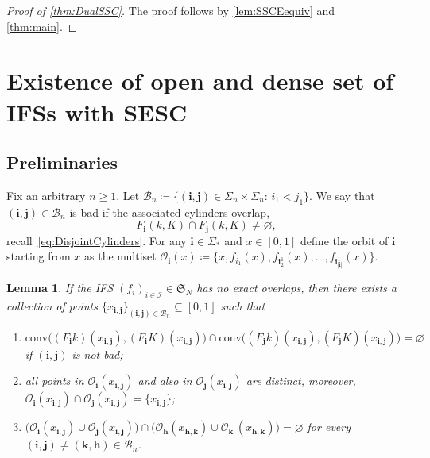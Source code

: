 \documentclass[11pt,a4paper]{article}
\def\cref#1{\ref{#1}}%
\newtheorem{lemma}[theorem]{Lemma}
\theoremstyle{definition}
\theoremstyle{remark}
\newcommand{\0}{\mathbf{0}}
\newcommand{\bi}{\mathbf{i}}
\newcommand{\bj}{\mathbf{j}}
\newcommand{\bk}{{\mathbf{k}}}
\newcommand{\bh}{{\mathbf{h}}}
\numberwithin{equation}{section}
\begin{document}
\begin{proof}[Proof of \cref{thm:DualSSC}]
	The proof follows by \cref{lem:SSCEequiv} and \cref{thm:main}.
\end{proof}

\section{Existence of open and dense set of IFSs with SESC}\label{sec:ProofESCOpenDense}

\subsection{Preliminaries}

Fix an arbitrary $n\geq 1$. Let $\mathcal{B}_n\coloneqq\{(\bi,\bj)\in\Sigma_n\times\Sigma_n:\,
i_1<j_1\}$. We say that $(\bi,\bj)\in\mathcal{B}_n$ is bad if the associated cylinders overlap,
\begin{equation}\label{eq:DefBad}
F_{\bi}(k,K)\cap F_{\bj}(k,K)\neq\varnothing,
\end{equation}
recall~\cref{eq:DisjointCylinders}. For any $\bi\in\Sigma_*$ and $x\in[0,1]$ define the orbit of
$\bi$ starting from $x$ as the multiset $\mathcal{O}_{\bi}(x)\coloneqq \{x,f_{i_1}(x),
f_{\bi_2^1}(x),\ldots,f_{\bi_{|\bi|}^1}(x)\}$. 


\begin{lemma}\label{lem:Pointsx_ij}
If the IFS $(f_i)_{i\in\mathcal{I}}\in\mathfrak{S}_N$ has no exact overlaps, then there exists a collection of points
$\{x_{\bi,\bj}\}_{(\bi,\bj)\in\mathcal{B}_n}\subseteq[0,1]$ such that
\begin{enumerate}[label=(\alph*)]
  \item\label{it:lla} $\mathrm{conv}\big((F_{\bi}k)(x_{\bi,\bj}), (F_{\bi}K)(x_{\bi,\bj})\big) \cap
  \mathrm{conv}\big((F_{\bj}k)(x_{\bi,\bj}),
	(F_{\bj}K)(x_{\bi,\bj})\big)= \varnothing$ if $(\bi,\bj)$ is not bad;  
      \item\label{it:llb} all points in $\mathcal{O}_{\bi}(x_{\bi,\bj})$ and also in $\mathcal{O}_{\bj}(x_{\bi,\bj})$
  are distinct, moreover,
  $\mathcal{O}_{\bi}(x_{\bi,\bj})\cap\mathcal{O}_{\bj}(x_{\bi,\bj})=\{x_{\bi,\bj}\}$;
\item\label{it:llc} $\big(\mathcal{O}_{\bi}(x_{\bi,\bj})\cup \mathcal{O}_{\bj}(x_{\bi,\bj})\big) \cap
  \big(\mathcal{O}_{\bh}(x_{\bh,\bk})\cup
  \mathcal{O}_{\bk}\,(x_{\bh,\bk})\big)=\varnothing$ for every $(\bi,\bj)\neq
  (\bk,\bh)\in\mathcal{B}_n$.
\end{enumerate} 
\end{lemma}
\end{document}
